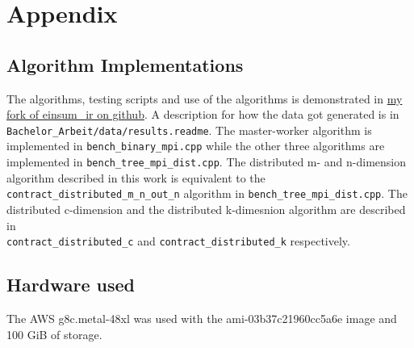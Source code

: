 \newpage

\appendix

\section{Appendix}

\subsection{Algorithm Implementations}

The algorithms, testing scripts and use of the algorithms is demonstrated in 
\href{https://github.com/Minutenreis/einsum_ir}{my fork of einsum\_ir on github}.
A description for how the data got generated is in \\
\texttt{Bachelor\_Arbeit/data/results.readme}.
The master-worker algorithm is implemented in \texttt{bench\_binary\_mpi.cpp} while the other three algorithms are implemented in \texttt{bench\_tree\_mpi\_dist.cpp}.
The distributed m- and n-dimension algorithm described in this work is equivalent to the \texttt{contract\_distributed\_m\_n\_out\_n} algorithm in \texttt{bench\_tree\_mpi\_dist.cpp}.
The distributed c-dimension and the distributed k-dimesnion algorithm are described in\\ \texttt{contract\_distributed\_c} and \texttt{contract\_distributed\_k} respectively.

\subsection{Hardware used}

The AWS g8c.metal-48xl was used with the ami-03b37c21960cc5a6e image and 100 GiB of storage.
